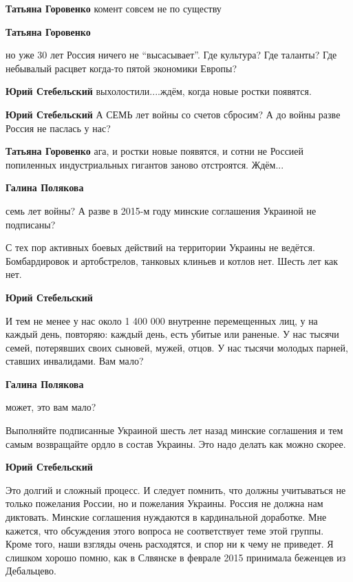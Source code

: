 \begin{itemize}
\begin{itemize}
\textbf{Татьяна Горовенко} комент совсем не по существу

\textbf{Татьяна Горовенко} 

но уже 30 лет Россия ничего не \enquote{высасывает}. Где культура? Где таланты? Где
небывалый расцвет когда-то пятой экономики Европы?

\begin{itemize} %
\textbf{Юрий Стебельский} выхолостили....ждём, когда новые ростки появятся.

\textbf{Юрий Стебельский} А СЕМЬ лет войны со счетов сбросим? А до войны разве Россия не паслась у нас?

\textbf{Татьяна Горовенко} ага, и ростки новые появятся, и сотни не Россией попиленных индустриальных гигантов заново отстроятся. Ждём...

\textbf{Галина Полякова} 

семь лет войны? А разве в 2015-м году минские соглашения Украиной не подписаны?

С тех пор активных боевых действий на территории Украины не ведётся.
Бомбардировок и артобстрелов, танковых клиньев и котлов нет. Шесть лет как нет.


\textbf{Юрий Стебельский} 

И тем не менее у нас около 1 400 000 внутренне перемещенных лиц, у на каждый
день, повторяю: каждый день, есть убитые или раненые. У нас тысячи семей,
потерявших своих сыновей, мужей, отцов. У нас тысячи молодых парней, ставших
инвалидами. Вам мало?

\textbf{Галина Полякова} 

может, это вам мало?

Выполняйте подписанные Украиной шесть лет назад минские соглашения и тем самым
возвращайте ордло в состав Украины. Это надо делать как можно скорее.

\textbf{Юрий Стебельский} 

Это долгий и сложный процесс. И следует помнить, что должны учитываться не
только пожелания России, но и пожелания Украины. Россия не должна нам
диктовать. Минские соглашения нуждаются в кардинальной доработке. Мне кажется,
что обсуждения этого вопроса не соответствует теме этой группы. Кроме того,
наши взгляды очень расходятся, и спор ни к чему не приведет. Я слишком хорошо
помню, как в Слвянске в феврале 2015 принимала беженцев из Дебальцево.


\end{itemize}
\end{itemize}
\end{itemize}
